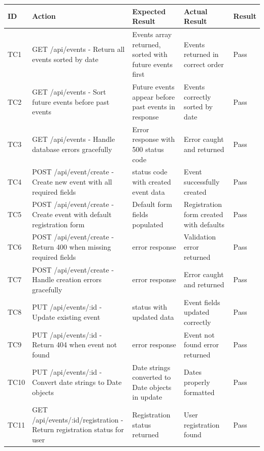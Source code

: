 \documentclass[12pt, titlepage]{article}
\begin{document}
\noindent
\begin{longtable}{|>{\raggedright\arraybackslash}p{1cm}|>{\raggedright\arraybackslash}p{5cm}|>{\raggedright\arraybackslash}p{3.25cm}|>{\raggedright\arraybackslash}p{3.25cm}|>{\raggedright\arraybackslash}p{1.5cm}|}
\hline
\textbf{ID} & \textbf{Action} & \textbf{Expected Result} & \textbf{Actual Result} & \textbf{Result} \\\hline
\endhead
\hline
TC1 & GET /api/events - Return all events sorted by date & Events array returned, sorted with future events first & Events returned in correct order & \cellcolor{green!30}Pass \\
\hline
TC2 & GET /api/events - Sort future events before past events & Future events appear before past events in response & Events correctly sorted by date & \cellcolor{green!30}Pass \\
\hline
TC3 & GET /api/events - Handle database errors gracefully & Error response with 500 status code & Error caught and returned & \cellcolor{green!30}Pass \\
\hline
TC4 & POST /api/event/create - Create new event with all required fields & 201 status code with created event data & Event successfully created & \cellcolor{green!30}Pass \\
\hline
TC5 & POST /api/event/create - Create event with default registration form & Default form fields populated & Registration form created with defaults & \cellcolor{green!30}Pass \\
\hline
TC6 & POST /api/event/create - Return 400 when missing required fields & 400 error response & Validation error returned & \cellcolor{green!30}Pass \\
\hline
TC7 & POST /api/event/create - Handle creation errors gracefully & 500 error response & Error caught and returned & \cellcolor{green!30}Pass \\
\hline
TC8 & PUT /api/events/:id - Update existing event & 200 status with updated data & Event fields updated correctly & \cellcolor{green!30}Pass \\
\hline
TC9 & PUT /api/events/:id - Return 404 when event not found & 404 error response & Event not found error returned & \cellcolor{green!30}Pass \\
\hline
TC10 & PUT /api/events/:id - Convert date strings to Date objects & Date strings converted to Date objects in update & Dates properly formatted & \cellcolor{green!30}Pass \\
\hline
TC11 & GET /api/events/:id/registration - Return registration status for user & Registration status returned & User registration found & \cellcolor{green!30}Pass \\

\end{longtable}
\end{document}
